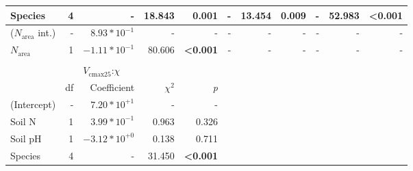 \begin{landscape}
\begin{table}
{\begin{tabular}{p{2.5cm}p{0.5cm}p{2cm}p{1.5cm}p{1.5cm}p{2cm}p{1.5cm}p{1.5cm}p{2cm}p{1.5cm}p{1.5cm}}
        Species & \multicolumn{1}{r}{4}
        & \multicolumn{1}{r}{-} & \multicolumn{1}{r}{18.843} & \multicolumn{1}{r}{\textbf{0.001}}
        & \multicolumn{1}{r}{-} & \multicolumn{1}{r}{13.454} & \multicolumn{1}{r}{\textbf{0.009}}
        & \multicolumn{1}{r}{-} & \multicolumn{1}{r}{52.983} & \multicolumn{1}{r}{\textbf{<0.001}}
        \\
        \hline

        ($N_\mathrm{area}$ int.) & \multicolumn{1}{r}{-}
        & \multicolumn{1}{r}{$8.93*10^{-1}$}  & \multicolumn{1}{r}{-}    & \multicolumn{1}{r}{-}
        & \multicolumn{1}{r}{-}         & \multicolumn{1}{r}{-}    & \multicolumn{1}{r}{-}
        & \multicolumn{1}{r}{-}         & \multicolumn{1}{r}{-}    & \multicolumn{1}{r}{-}
        \\

        $N_\mathrm{area}$ & \multicolumn{1}{r}{1}
        & \multicolumn{1}{r}{$-1.11*10^{-1}$} & \multicolumn{1}{r}{80.606}  & \multicolumn{1}{r}{\textbf{<0.001}}
        & \multicolumn{1}{r}{-}         & \multicolumn{1}{r}{-}       & \multicolumn{1}{r}{-}
        & \multicolumn{1}{r}{-}         & \multicolumn{1}{r}{-}       & \multicolumn{1}{r}{-}
        \\
        \hline

        &&&&&&&&&&
        \\

        && \multicolumn{3}{l}{$V_{\mathrm{cmax25}}$:$\chi$} &&&&& \\
        \hline
        & \multicolumn{1}{r}{df}
        & \multicolumn{1}{r}{Coefficient} & \multicolumn{1}{r}{$\chi^{2}$} & \multicolumn{1}{r}{\textit{p}} 
        \\
        \hline

        (Intercept) & \multicolumn{1}{r}{-}
        & \multicolumn{1}{r}{$7.20*10^{+1}$} & \multicolumn{1}{r}{-} & \multicolumn{1}{r}{-}
        &&&&&&
        \\

        Soil N & \multicolumn{1}{r}{1}
        & \multicolumn{1}{r}{$3.99*10^{-1}$}  & \multicolumn{1}{r}{0.963} & \multicolumn{1}{r}{0.326}
        &&&&&& 
        \\

        Soil pH & \multicolumn{1}{r}{1}
        & \multicolumn{1}{r}{$-3.12*10^{+0}$} & \multicolumn{1}{r}{0.138} & \multicolumn{1}{r}{0.711}
        &&&&&& 
        \\

        Species & \multicolumn{1}{r}{4}
        & \multicolumn{1}{r}{-} & \multicolumn{1}{r}{31.450} & \multicolumn{1}{r}{\textbf{<0.001}}
        \\
        \hline


\end{tabular}}
\end{table}
\end{landscape}
